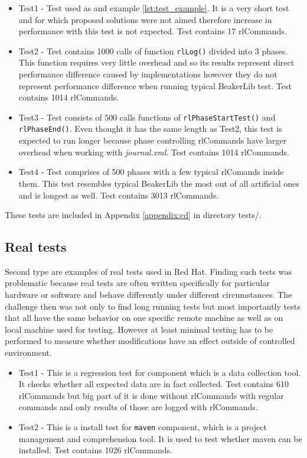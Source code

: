 \begin{itemize}
\item Test1 - Test used as and example \ref{lst:test_example}. It is a very short test and for which proposed solutions were not aimed therefore increase in performance with this test is not expected. Test contains 17 rlCommands.
\item Test2 - Test contains 1000 calls of function \texttt{rlLog()} divided into 3 phases. This function requires very little overhead and so its results represent direct performance difference caused by implementations however they do not represent performance difference when running typical BeakerLib test. Test contains 1014 rlCommands.
\item Test3 - Test consists of 500 calls functions of \texttt{rlPhaseStartTest()} and \texttt{rlPhaseEnd()}. Even thought it has the same length as Test2, this test is expected to run longer because phase controlling rlCommands have larger overhead when working with \textit{journal.xml}. Test contains 1014 rlCommands.
\item Test4 - Test comprises of 500 phases with a few typical rlComands inside them. This test resembles typical BeakerLib the most out of all artificial ones and is longest as well. Test contains 3013 rlCommands.
\end{itemize}

These tests are included in Appendix \ref{appendix:cd} in directory tests/.

\subsection{Real tests}
Second type are examples of real tests used in Red Hat. Finding such tests was problematic because real tests are often written specifically for particular hardware or software and behave differently under different circumstances. The challenge then was not only to find long running tests but most importantly tests that all have the same behavior on one specific remote machine as well as on local machine used for testing.
However at least minimal testing has to be performed to measure whether modifications have an effect outside of controlled environment.

\begin{itemize}
\item Test1 - This is a regression test for component  which is a data collection tool. It checks whether all expected data are in fact collected. Test contains 610 rlCommands but big part of it is done without rlCommands with regular commands and only results of those are logged with rlCommands.
\item Test2 - This is a install test for \texttt{maven} component, which is a project management and comprehension tool. It is used to test whether maven can be installed. Test contains 1026 rlCommands.
\end{itemize}

